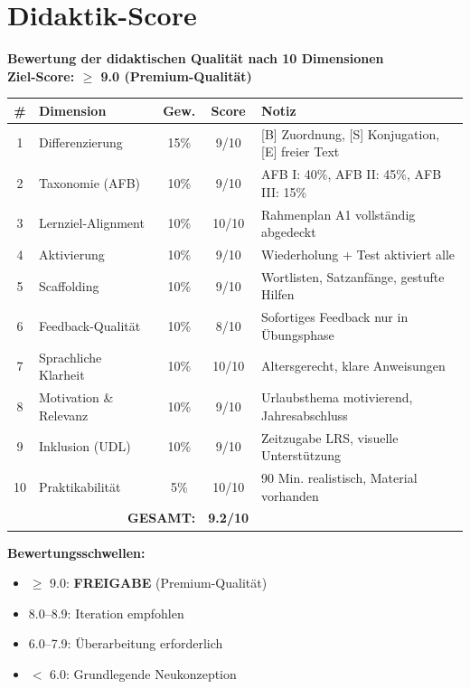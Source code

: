 \documentclass[11pt,a4paper]{article}
\begin{document}
\newpage
\section{Didaktik-Score}

\begin{scorebox}
\textbf{Bewertung der didaktischen Qualität nach 10 Dimensionen}\\
\textbf{Ziel-Score: $\geq$ 9.0 (Premium-Qualität)}

\vspace{1em}
\begin{tabular}{|c|l|c|c|p{4.5cm}|}
\hline
\textbf{\#} & \textbf{Dimension} & \textbf{Gew.} & \textbf{Score} & \textbf{Notiz} \\
\hline
1 & Differenzierung & 15\% & 9/10 & [B] Zuordnung, [S] Konjugation, [E] freier Text \\
\hline
2 & Taxonomie (AFB) & 10\% & 9/10 & AFB I: 40\%, AFB II: 45\%, AFB III: 15\% \\
\hline
3 & Lernziel-Alignment & 10\% & 10/10 & Rahmenplan A1 vollständig abgedeckt \\
\hline
4 & Aktivierung & 10\% & 9/10 & Wiederholung + Test aktiviert alle \\
\hline
5 & Scaffolding & 10\% & 9/10 & Wortlisten, Satzanfänge, gestufte Hilfen \\
\hline
6 & Feedback-Qualität & 10\% & 8/10 & Sofortiges Feedback nur in Übungsphase \\
\hline
7 & Sprachliche Klarheit & 10\% & 10/10 & Altersgerecht, klare Anweisungen \\
\hline
8 & Motivation \& Relevanz & 10\% & 9/10 & Urlaubsthema motivierend, Jahresabschluss \\
\hline
9 & Inklusion (UDL) & 10\% & 9/10 & Zeitzugabe LRS, visuelle Unterstützung \\
\hline
10 & Praktikabilität & 5\% & 10/10 & 90 Min. realistisch, Material vorhanden \\
\hline
\multicolumn{3}{|r|}{\textbf{GESAMT:}} & \textbf{9.2/10} & \\
\hline
\end{tabular}

\vspace{1em}
\textbf{Bewertungsschwellen:}
\begin{itemize}
    \item[\checkmark] \textcolor{successgreen}{$\geq$ 9.0: \textbf{FREIGABE} (Premium-Qualität)}
    \item[$\Box$] \textcolor{warningorange}{8.0--8.9: Iteration empfohlen}
    \item[$\Box$] 6.0--7.9: Überarbeitung erforderlich
    \item[$\Box$] $<$ 6.0: Grundlegende Neukonzeption
\end{itemize}
\end{scorebox}
\end{document}
